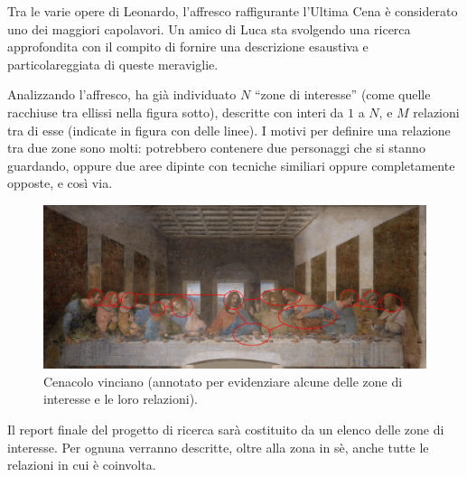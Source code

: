 \usepackage{xcolor}
\usepackage{afterpage}
\usepackage{pifont,mdframed}
\usepackage[bottom]{footmisc}
\usepackage{tikz}
\usepackage{tikz-qtree}

\makeatletter
\gdef\this@inputfilename{input}
\gdef\this@outputfilename{output}
\makeatother

\newcommand{\funcitem}[2]{\item[$\blacksquare$] \textbf{\large \textsf{Funzione} \texttt{#1}} \vspace{-0.3cm} \begin{center}\begin{tabularx}{\textwidth}{|c|X|} \hline #2 \hline \end{tabularx}\end{center}}

Tra le varie opere di Leonardo, l'affresco raffigurante l'Ultima Cena è considerato uno dei maggiori capolavori. Un amico di Luca sta svolgendo una ricerca approfondita con il compito di fornire una descrizione esaustiva e particolareggiata di queste meraviglie.

Analizzando l'affresco, ha già individuato $N$ ``zone di interesse'' (come quelle racchiuse tra ellissi nella figura sotto), descritte con interi da $1$ a $N$, e $M$ relazioni tra di esse (indicate in figura con delle linee). I motivi per definire una relazione tra due zone sono molti: potrebbero contenere due personaggi che si stanno guardando, oppure due aree dipinte con tecniche similiari oppure completamente opposte, e così via.

\begin{figure}[h]
  \begin{center}
        \includegraphics[width=\linewidth]{ultimacena.jpg}
        \caption{Cenacolo vinciano (annotato per evidenziare alcune delle zone di interesse e le loro relazioni).}
  \end{center}
\end{figure}

Il report finale del progetto di ricerca sarà costituito da un elenco delle zone di interesse. Per ognuna verranno descritte, oltre alla zona in sè, anche tutte le relazioni in cui è coinvolta.

